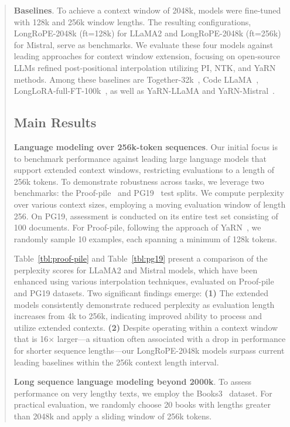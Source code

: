 \begin{abstract}
\textbf{Baselines}. To achieve a context window of 2048k, models were fine-tuned with 128k and 256k window lengths. The resulting configurations, LongRoPE-2048k (ft=128k) for LLaMA2 and LongRoPE-2048k (ft=256k) for Mistral, serve as benchmarks. We evaluate these four models against leading approaches for context window extension, focusing on open-source LLMs refined post-positional interpolation utilizing PI, NTK, and YaRN methods. Among these baselines are Together-32k~\cite{together}, Code LLaMA~\cite{codellama}, LongLoRA-full-FT-100k~\cite{longlora}, as well as YaRN-LLaMA and YaRN-Mistral~\cite{yarn}.

\subsection{Main Results}

\label{sec:mainresult}
\textbf{Language modeling over 256k-token sequences}. Our initial focus is to benchmark performance against leading large language models that support extended context windows, restricting evaluations to a length of 256k tokens. To demonstrate robustness across tasks, we leverage two benchmarks: the Proof-pile~\cite{pg19} and PG19~\cite{pile} test splits. We compute perplexity over various context sizes, employing a moving evaluation window of length 256. On PG19, assessment is conducted on its entire test set consisting of 100 documents. For Proof-pile, following the approach of YaRN~\cite{yarn}, we randomly sample 10 examples, each spanning a minimum of 128k tokens.

Table~\ref{tbl:proof-pile} and Table~\ref{tbl:pg19} present a comparison of the perplexity scores for LLaMA2 and Mistral models, which have been enhanced using various interpolation techniques, evaluated on Proof-pile and PG19 datasets. Two significant findings emerge: \textbf{(1)} The extended models consistently demonstrate reduced perplexity as evaluation length increases from 4k to 256k, indicating improved ability to process and utilize extended contexts. \textbf{(2)} Despite operating within a context window that is 16$\times$ larger—a situation often associated with a drop in performance for shorter sequence lengths—our LongRoPE-2048k models surpass current leading baselines within the 256k context length interval.

\textbf{Long sequence language modeling beyond 2000k}. To assess performance on very lengthy texts, we employ the Books3~\cite{pile} dataset. For practical evaluation, we randomly choose 20 books with lengths greater than 2048k and apply a sliding window of 256k tokens.


\end{abstract}
